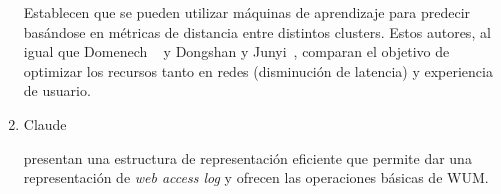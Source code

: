 \begin{enumerate}
	{ 
		
	  Establecen que se pueden utilizar máquinas de aprendizaje para predecir basándose en métricas de distancia entre distintos clusters. Estos autores, al igual que Domenech \etal~\cite{Domenech2006} y Dongshan y Junyi~\cite{Dongshan2002}, comparan el objetivo de optimizar los recursos tanto en redes (disminución de latencia) y experiencia de usuario.
	  }
  
  \item Claude \etal~\cite{Claude2014} 
  
	{  
	presentan una estructura de representación eficiente que permite dar una representación de \emph{web access log} y ofrecen las operaciones básicas de WUM.
  }
\end{enumerate}

